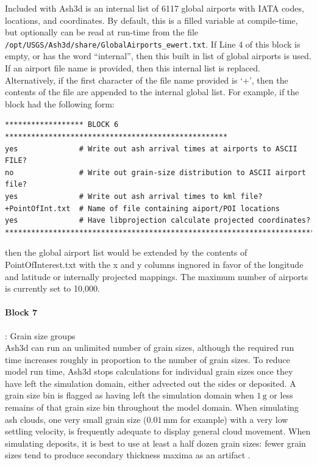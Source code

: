 Included with Ash3d is an internal list of 6117 global airports with IATA codes,
locations, and coordinates. By default, this is a filled variable at compile-time,
but optionally can be read at run-time from the
file \texttt{/opt/USGS/Ash3d/share/GlobalAirports\_ewert.txt}. If Line 4 of this
block is empty, or has the word ``internal'', then this built in list of global
airports is used. If an airport file name is provided, then this internal list
is replaced. Alternatively, if the first character of the file name provided is
`+', then the contents of the file are appended to the internal global list. For
example, if the block had the following form:
\small
\begin{verbatim}
****************** BLOCK 6 ***************************************************
yes              # Write out ash arrival times at airports to ASCII FILE?
no               # Write out grain-size distribution to ASCII airport file?
yes              # Write out ash arrival times to kml file?
+PointOfInt.txt  # Name of file containing aiport/POI locations
yes              # Have libprojection calculate projected coordinates?
*******************************************************************************
\end{verbatim}
\normalsize
then the global airport list would be extended by the contents of PointOfInterest.txt
with the x and y columns ingnored in favor of the longitude and latitude or
internally projected mappings. The maximum number of airports is currently set
to 10,000.

\paragraph{Block 7}: Grain size groups\\
Ash3d can run an unlimited number of grain sizes, although the required run time
increases roughly in proportion to the number of grain sizes. To reduce model run
time, Ash3d stops calculations for individual grain sizes once they have left the
simulation domain, either advected out the sides or deposited. A grain size bin is
flagged as having left the simulation domain when $1 \, \mathrm{g}$ or less remains of
that grain size bin throughout the model domain.
When simulating ash clouds, one very small grain size ($0.01 \, \mathrm{mm}$ for
example) with a
very low settling velocity, is frequently adequate to display general cloud movement.
When simulating deposits, it is best to use at least a half dozen grain sizes: fewer
grain sizes tend to produce secondary thickness maxima as an artifact
\cite{Mastin12}.

